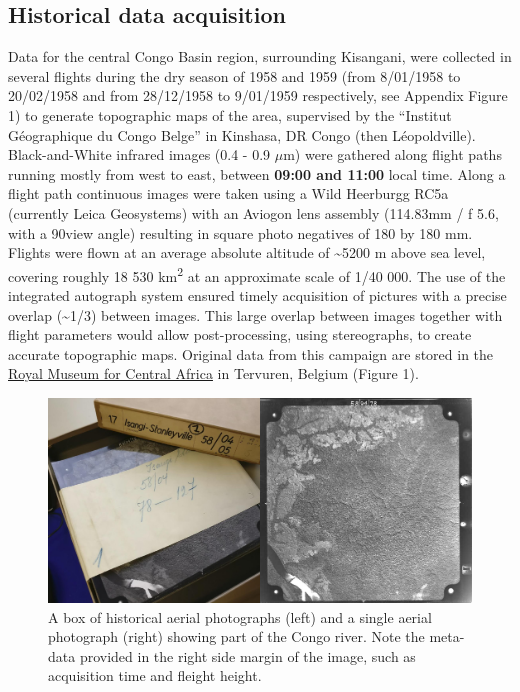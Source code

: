 \documentclass[remote sensing,article,submit,moreauthors,pdftex]{mdpi}
\begin{document}
\hypertarget{historical-data-acquisition}{%
\subsection{Historical data
acquisition}\label{historical-data-acquisition}}

Data for the central Congo Basin region, surrounding Kisangani, were
collected in several flights during the dry season of 1958 and 1959
(from 8/01/1958 to 20/02/1958 and from 28/12/1958 to 9/01/1959
respectively, see Appendix Figure 1) to generate topographic maps of the
area, supervised by the ``Institut Géographique du Congo Belge'' in
Kinshasa, DR Congo (then Léopoldville). Black-and-White infrared images
(0.4 - 0.9 \(\mu\)m) were gathered along flight paths running mostly
from west to east, between \textbf{09:00 and 11:00} local time. Along a
flight path continuous images were taken using a Wild Heerburgg RC5a
(currently Leica Geosystems) with an Aviogon lens assembly (114.83mm / f
5.6, with a 90\degree view angle) resulting in square photo negatives of
180 by 180 mm. Flights were flown at an average absolute altitude of
\textasciitilde{}5200 m above sea level, covering roughly 18 530
km\textsuperscript{2} at an approximate scale of 1/40 000. The use of
the integrated autograph system ensured timely acquisition of pictures
with a precise overlap (\textasciitilde{}1/3) between images. This large
overlap between images together with flight parameters would allow
post-processing, using stereographs, to create accurate topographic
maps. Original data from this campaign are stored in the
\href{https://www.africamuseum.be/en}{Royal Museum for Central Africa}
in Tervuren, Belgium (Figure 1).

\begin{figure}

{\centering \includegraphics[width=0.75\linewidth]{./figures/print_examples} 

}

\caption{A box of historical aerial photographs (left) and a single aerial photograph (right) showing part of the Congo river. Note the meta-data provided in the right side margin of the image, such as acquisition time and fleight height.}\label{fig:unnamed-chunk-1}
\end{figure}
\end{document}
